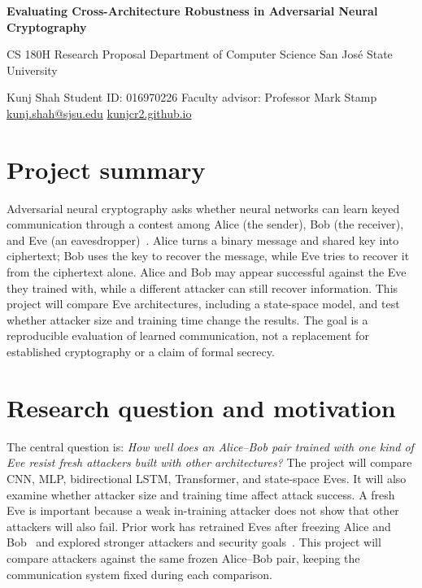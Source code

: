 \documentclass[10pt,letterpaper]{article}
\begin{document}
\begin{center}
  {\Large\bfseries Evaluating Cross-Architecture Robustness in Adversarial Neural Cryptography\par}
  \vspace{5pt}
  {\normalsize CS 180H Research Proposal \textbar{} Department of Computer Science \textbar{} San Jos\'e State University\par}
  \vspace{4pt}
  Kunj Shah \textbar{} Student ID: 016970226 \textbar{} Faculty advisor: Professor Mark Stamp\\
  \href{mailto:kunj.shah@sjsu.edu}{kunj.shah@sjsu.edu} \textbar{}
  \href{https://kunjcr2.github.io}{kunjcr2.github.io}
\end{center}

\vspace{-5pt}
\section{Project summary}
Adversarial neural cryptography asks whether neural networks can learn keyed communication through a contest among Alice (the sender), Bob (the receiver), and Eve (an eavesdropper)~\cite{abadi2016}. Alice turns a binary message and shared key into ciphertext; Bob uses the key to recover the message, while Eve tries to recover it from the ciphertext alone. Alice and Bob may appear successful against the Eve they trained with, while a different attacker can still recover information. This project will compare Eve architectures, including a state-space model, and test whether attacker size and training time change the results. The goal is a reproducible evaluation of learned communication, not a replacement for established cryptography or a claim of formal secrecy.

\section{Research question and motivation}
The central question is: \emph{How well does an Alice--Bob pair trained with one kind of Eve resist fresh attackers built with other architectures?} The project will compare CNN, MLP, bidirectional LSTM, Transformer, and state-space Eves. It will also examine whether attacker size and training time affect attack success. A fresh Eve is important because a weak in-training attacker does not show that other attackers will also fail. Prior work has retrained Eves after freezing Alice and Bob~\cite{abadi2016} and explored stronger attackers and security goals~\cite{coutinho2018,zhou2019,li2020}. This project will compare attackers against the same frozen Alice--Bob pair, keeping the communication system fixed during each comparison.
\end{document}
